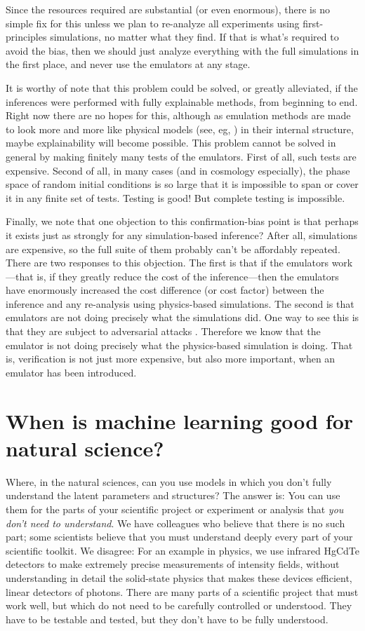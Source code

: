 \documentclass{article}
\begin{document}
Since the resources required are substantial (or even enormous), there is no simple fix for this unless we plan to re-analyze all experiments using first-principles simulations, no matter what they find.
If that is what's required to avoid the bias, then we should just analyze everything with the full simulations in the first place, and never use the emulators at any stage.

It is worthy of note that this problem could be solved, or greatly alleviated, if the inferences were performed with fully explainable methods, from beginning to end.
Right now there are no hopes for this, although as emulation methods are made to look more and more like physical models (see, eg, \citealt{scalars, villar2023dimensionless}) in their internal structure, maybe explainability will become possible.
This problem cannot be solved in general by making finitely many tests of the emulators.
First of all, such tests are expensive.
Second of all, in many cases (and in cosmology especially), the phase space of random initial conditions is so large that it is impossible to span or cover it in any finite set of tests.
Testing is good! But complete testing is impossible.

Finally, we note that one objection to this confirmation-bias point is that perhaps it exists just as strongly for any simulation-based inference?
After all, simulations are expensive, so the full suite of them probably can't be affordably repeated.
There are two responses to this objection.
The first is that if the emulators work---that is, if they greatly reduce the cost of the inference---then the emulators have enormously increased the cost difference (or cost factor) between the inference and any re-analysis using physics-based simulations.
The second is that emulators are not doing precisely what the simulations did.
One way to see this is that they are subject to adversarial attacks \cite{melchior}.
Therefore we know that the emulator is not doing precisely what the physics-based simulation is doing.
That is, verification is not just more expensive, but also more important, when an emulator has been introduced.

\section{When is machine learning good for natural science?}\label{sec:good}
Where, in the natural sciences, can you use models in which you don't fully understand the latent parameters and structures?
The answer is: You can use them for the parts of your scientific project or experiment or analysis that \emph{you don't need to understand}.
We have colleagues who believe that there is no such part; some scientists believe that you must understand deeply every part of your scientific toolkit.
We disagree: For an example in physics, we use infrared HgCdTe detectors \cite{hgcdte} to make extremely precise measurements of intensity fields, without understanding in detail the solid-state physics that makes these devices efficient, linear detectors of photons.
There are many parts of a scientific project that must work well, but which do not need to be carefully controlled or understood.
They have to be testable and tested, but they don't have to be fully understood.
\end{document}
